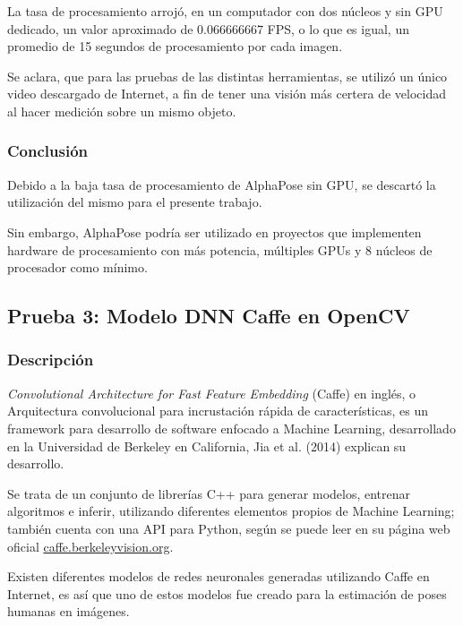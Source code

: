 \documentclass[a4paper,12pt,oneside,spanish]{book}
\begin{document}
La tasa de procesamiento arrojó, en un computador con dos núcleos y sin GPU dedicado, un valor aproximado de 0.066666667 FPS, o lo que es igual, un promedio de 15 segundos de procesamiento por cada imagen. \par

Se aclara, que para las pruebas de las distintas herramientas, se utilizó un único video descargado de Internet, a fin de tener una visión más certera de velocidad al hacer medición sobre un mismo objeto.\par

\subsubsection{Conclusión}
Debido a la baja tasa de procesamiento de AlphaPose sin GPU, se descartó la utilización del mismo para el presente trabajo.\par 

Sin embargo, AlphaPose podría ser utilizado en proyectos que implementen hardware de procesamiento con más potencia, múltiples GPUs y 8 núcleos de procesador como mínimo.\par

\subsection{Prueba 3: Modelo DNN Caffe en OpenCV}
\subsubsection{Descripción}
\textit{Convolutional Architecture for Fast Feature Embedding} (Caffe) en inglés, o Arquitectura convolucional para incrustación rápida de características, es un framework para desarrollo de software enfocado a Machine Learning, desarrollado en la Universidad de Berkeley en California, Jia et al. (2014) explican su desarrollo.\par 

Se trata de un conjunto de librerías C++ para generar modelos, entrenar algoritmos e inferir, utilizando diferentes elementos propios de Machine Learning; también cuenta con una API para Python, según se puede leer en su página web oficial \url{caffe.berkeleyvision.org}.\par 

Existen diferentes modelos de redes neuronales generadas utilizando Caffe en Internet, es así que uno de estos modelos fue creado para la estimación de poses humanas en imágenes. \par
\end{document}
